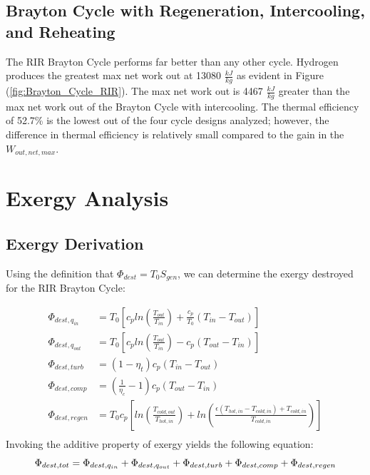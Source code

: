 \documentclass[
	12pt, %
]{brayton_cycle_report_style}
\begin{document}
\subsection{Brayton Cycle with Regeneration, Intercooling, and Reheating}

The RIR Brayton Cycle performs far better than any other cycle. Hydrogen produces the greatest max net work out at 13080 $\frac{kJ}{kg}$ as evident in Figure (\ref{fig:Brayton_Cycle_RIR}). The max net work out is 4467 $\frac{kJ}{kg}$ greater than the max net work out of the Brayton Cycle with intercooling. The thermal efficiency of 52.7\% is the lowest out of the four cycle designs analyzed; however, the difference in thermal efficiency is relatively small compared to the gain in the $W_{out,net,max}$.

\section{Exergy Analysis}

\subsection{Exergy Derivation}

Using the definition that $\Phi_{dest} = T_{0} S_{gen}$, we can determine the exergy destroyed for the RIR Brayton Cycle:

\begin{align*}
    \Phi_{dest,q_{in}} &= T_{0}\left[ c_pln \left( \frac{T_{out}}{T_{in}} \right) + \frac{c_p}{T_0}\left(T_{in} - T_{out}\right) \right] \\
    \Phi_{dest,q_{out}} &= T_{0} \left[ c_pln \left( \frac{T_{out}}{T_{in}} \right) - c_p\left(T_{out} - T_{in}\right) \right] \\
    \Phi_{dest,turb} &= (1 - \eta_t)c_p(T_{in} - T_{out})\\
    \Phi_{dest,comp} &= \left(\frac{1}{\eta_c} - 1\right)c_p(T_{out}-T_{in})\\
    \Phi_{dest,regen} &= T_0 c_p \left[ln\left(\frac{T_{cold,out}}{T_{hot,in}}\right) + ln\left( \frac{\epsilon(T_{hot,in} - T_{cold,in}) + T_{cold,in}}{T_{cold,in}}\right) \right]\\
\end{align*} 
Invoking the additive property of exergy yields the following equation: \\

\begin{equation}
    \Phi_{dest,tot} = \Phi_{dest,q_{in}} + \Phi_{dest,q_{out}} + \Phi_{dest,turb} + \Phi_{dest, comp} + \Phi_{dest, regen} \\
    \label{Exergy_Dest}
\end{equation}
\end{document}
